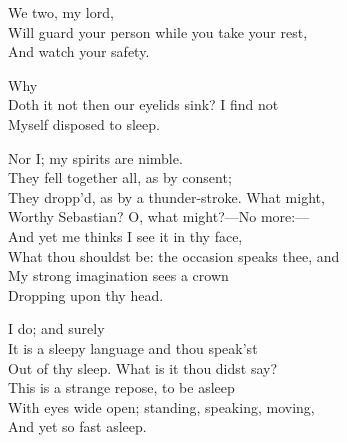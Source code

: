 \begin{verse_speech}[Antonio] 
We two, my lord,\\
Will guard your person while you take your rest,\\
And watch your safety.
\end{verse_speech}


\begin{verse_speech}[Sebastian] 
Why\\
Doth it not then our eyelids sink? I find not\\
Myself disposed to sleep.
\end{verse_speech}

\begin{verse_speech}[Antonio] 
Nor I; my spirits are nimble.\\
They fell together all, as by consent;\\
They dropp'd, as by a thunder-stroke. What might,\\
Worthy Sebastian? O, what might?—No more:—\\
And yet me thinks I see it in thy face,\\
What thou shouldst be: the occasion speaks thee, and\\
My strong imagination sees a crown\\
Dropping upon thy head.
\end{verse_speech}

\begin{verse_speech}[Sebastian] 
I do; and surely\\
It is a sleepy language and thou speak'st\\
Out of thy sleep. What is it thou didst say?\\
This is a strange repose, to be asleep\\
With eyes wide open; standing, speaking, moving,\\
And yet so fast asleep.
\end{verse_speech}

